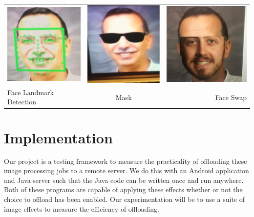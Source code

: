 \documentclass{sig-alternate}
\begin{document}
\begin{itemize}
\begin{tabular}{l | c | r }
\noindent \includegraphics[scale=.3]{FaceLandMarks.png} & \includegraphics[scale=.3]{MaskEffect.png} &\noindent \includegraphics[scale=.3]{FaceSwap.png} \\
{\tiny Face Landmark Detection} & Mask & Face Swap \\
\end{tabular}
\end{itemize}

\section{Implementation}
Our project is a testing framework to measure the practicality of offloading these image processing jobs to a remote server. We do this with an Android application and Java server such that the Java code can be written once and run anywhere. Both of these programs are capable of applying these effects whether or not the choice to offload has been enabled. Our experimentation will be to use a suite of image effects to measure the efficiency of offloading.
\end{document}
